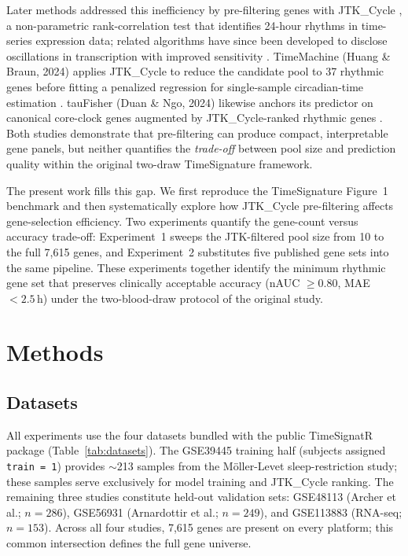 \documentclass[10pt,a4paper]{article}
\begin{document}
Later methods addressed this inefficiency by pre-filtering genes with
JTK\_Cycle \citep{Hughes2010}, a non-parametric rank-correlation test
that identifies 24-hour rhythms in time-series expression data;
related algorithms have since been developed to disclose oscillations
in transcription with improved sensitivity \citep{Antoulas2018}.
TimeMachine (Huang \& Braun, 2024) applies JTK\_Cycle to reduce
the candidate pool to 37 rhythmic genes before fitting a penalized
regression for single-sample circadian-time estimation
\citep{Huang2024}.
tauFisher (Duan \& Ngo, 2024) likewise anchors its predictor on
canonical core-clock genes augmented by JTK\_Cycle-ranked rhythmic
genes \citep{Duan2024}.
Both studies demonstrate that pre-filtering can produce compact,
interpretable gene panels, but neither quantifies the \emph{trade-off}
between pool size and prediction quality within the original
two-draw TimeSignature framework.

The present work fills this gap.
We first reproduce the TimeSignature Figure~1 benchmark and then
systematically explore how JTK\_Cycle pre-filtering affects
gene-selection efficiency.
Two experiments quantify the gene-count versus accuracy trade-off:
Experiment~1 sweeps the JTK-filtered pool size from 10 to the full
7,615 genes, and Experiment~2 substitutes five published gene sets
into the same pipeline.
These experiments together identify the minimum rhythmic gene set
that preserves clinically acceptable accuracy (nAUC $\geq 0.80$,
MAE $< 2.5$\,h) under the two-blood-draw protocol of the original
study.

\section{Methods}
 
\subsection{Datasets}
 
All experiments use the four datasets bundled with the public
TimeSignatR package (Table~\ref{tab:datasets}).
The GSE39445 training half (subjects assigned \texttt{train\,=\,1})
provides ${\sim}$213 samples from the Möller-Levet sleep-restriction
study; these samples serve exclusively for model training and
JTK\_Cycle ranking.
The remaining three studies constitute held-out validation sets:
GSE48113 (Archer et al.; $n = 286$), GSE56931 (Arnardottir et al.;
$n = 249$), and GSE113883 (RNA-seq; $n = 153$).
Across all four studies, 7,615 genes are present on every platform;
this common intersection defines the full gene universe.
 
\end{document}
